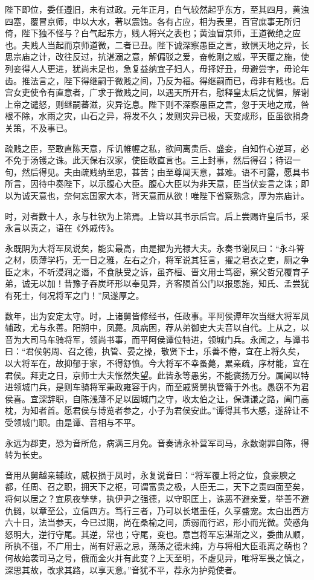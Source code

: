 \documentclass[]{article}
\begin{document}
陛下即位，委任遵旧，未有过政。元年正月，白气较然起乎东方，至其四月，黄浊四塞，覆冒京师，申以大水，著以震蚀。各有占应，相为表里，百官庶事无所归倚，陛下独不怪与？白气起东方，贱人将兴之表也；黄浊冒京师，王道微绝之应也。夫贱人当起而京师道微，二者已丑。陛下诚深察愚臣之言，致惧天地之异，长思宗庙之计，改往反过，抗湛溺之意，解偏驳之爱，奋乾刚之威，平天覆之施，使列妾得人人更进，犹尚未足也，急复益纳宜子妇人，毋择好丑，毋避尝字，毋论年齿。推法言之，陛下得继嗣于微贱之间，乃反为福。得继嗣而已，母非有贱也。后宫女吏使令有直意者，广求于微贱之间，以遇天所开右，慰释皇太后之忧愠，解谢上帝之谴怒，则继嗣蕃滋，灾异讫息。陛下则不深察愚臣之言，忽于天地之戒，咎根不除，水雨之灾，山石之异，将发不久；发则灾异已极，天变成形，臣虽欲捐身关策，不及事已。

疏贱之臣，至敢直陈天意，斥讥帷幄之私，欲间离贵后、盛妾，自知忤心逆耳，必不免于汤镬之诛。此天保右汉家，使臣敢直言也。三上封事，然后得召；待诏一旬，然后得见。夫由疏贱纳至忠，甚苦；由至尊闻天意，甚难。语不可露，愿具书所言，因待中奏陛下，以示腹心大臣。腹心大臣以为非天意，臣当伏妄言之诛；即以为诚天意也，奈何忘国家大本，背天意而从欲！唯陛下省察熟念，厚为宗庙计。

时，对者数十人，永与杜钦为上第焉。上皆以其书示后宫。后上尝赐许皇后书，采永言以责之，语在《外戚传》。

永既阴为大将军凤说矣，能实最高，由是擢为光禄大夫。永奏书谢凤曰：``永斗筲之材，质薄学朽，无一日之雅，左右之介，将军说其狂言，擢之皂衣之吏，厕之争臣之末，不听浸润之谮，不食肤受之诉，虽齐桓、晋文用士笃密，察父哲兄覆育子弟，诚无以加！昔豫子吞炭坏形以奉见异，齐客陨首公门以报恩施，知氏、孟尝犹有死士，何况将军之门！''凤遂厚之。

数年，出为安定太守。时，上诸舅皆修经书，任政事。平阿侯谭年次当继大将军凤辅政，尤与永善。阳朔中，凤薨。凤病困，荐从弟御史大夫音以自代。上从之，以音为大司马车骑将军，领尚书事，而平阿侯谭位特进，领城门兵。永闻之，与谭书曰：``君侯躬周、召之德，执管、晏之操，敬贤下士，乐善不倦，宜在上将久矣，以大将军在，故抑郁于家，不得舒愤。今大将军不幸蚤薨，累亲疏，序材能，宜在君侯。拜吏之日，京师士大夫怅然失望。此皆永等愚劣，不能褒扬万分。属闻以特进领城门兵，是则车骑将军秉政雍容于内，而至戚贤舅执管籥于外也。愚窃不为君侯喜。宜深辞职，自陈浅薄不足以固城门之守，收太伯之让，保谦谦之路，阖门高枕，为知者首。愿君侯与博览者参之，小子为君侯安此。''谭得其书大感，遂辞让不受领城门职。由是谭、音相与不平。

永远为郡吏，恐为音所危，病满三月免。音奏请永补营军司马，永数谢罪自陈，得转为长史。

音用从舅越亲辅政，威权损于凤时，永复说音曰：``将军覆上将之位，食豪腴之都，任周、召之职，拥天下之枢，可谓富贵之极，人臣无二，天下之责四面至矣，将何以居之？宜夙夜孳孳，执伊尹之强德，以守职匡上，诛恶不避亲爱，举善不避仇雠，以章至公，立信四方。笃行三者，乃可以长堪重任，久享盛宠。太白出西方六十日，法当参天，今已过期，尚在桑榆之间，质弱而行迟，形小而光微。荧惑角怒明大，逆行守尾。其逆，常也；守尾，变也。意岂将军忘湛渐之义，委曲从顺，所执不强，不广用士，尚有好恶之忌，荡荡之德未纯，方与将相大臣乖离之萌也？何故始袭司马之号，俄而金火并有此变？上天至明，不虚见异，唯将军畏之慎之，深思其故，改求其路，以享天意。''音犹不平，荐永为护菀使者。
\end{document}
